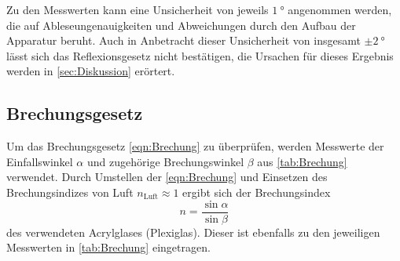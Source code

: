 Zu den Messwerten kann eine Unsicherheit von jeweils $\qty{1}{\degree}$ angenommen werden, die auf Ableseungenauigkeiten und Abweichungen durch den Aufbau der Apparatur beruht.
Auch in Anbetracht dieser Unsicherheit von insgesamt $\pm \qty{2}{\degree}$ lässt sich das Reflexionsgesetz nicht bestätigen, die Ursachen für dieses Ergebnis werden in
\autoref{sec:Diskussion} erörtert.

\subsection{Brechungsgesetz}
\label{subsec:A_Brechung}
Um das Brechungsgesetz \eqref{eqn:Brechung} zu überprüfen, werden Messwerte der Einfallswinkel $\alpha$ und zugehörige Brechungswinkel $\beta$ aus \autoref{tab:Brechung} verwendet.
Durch Umstellen der \autoref{eqn:Brechung} und Einsetzen des Brechungsindizes von Luft $n_\text{Luft} \approx 1$ ergibt sich der Brechungsindex 
\begin{equation*}
  n = \frac{\sin{\alpha}}{\sin{\beta}}
\end{equation*}
des verwendeten Acrylglases (Plexiglas). Dieser ist ebenfalls zu den jeweiligen Messwerten in \autoref{tab:Brechung} eingetragen. 

